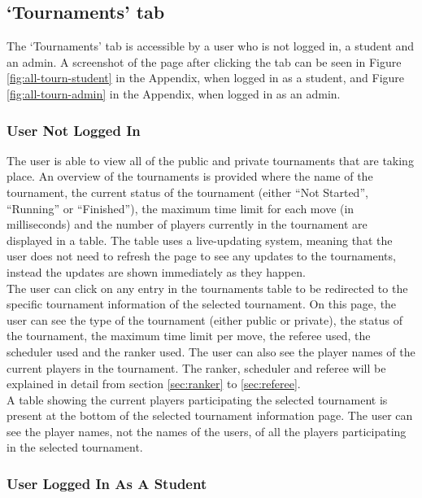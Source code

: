 \documentclass[a4paper, 12pt]{report}
\begin{document}
\subsection{`Tournaments' tab}
\label{sec:impl-tab-tournaments}

The `Tournaments' tab is accessible by a user who is not logged in, a student
and an admin. A screenshot of the page after clicking the tab can be seen in
Figure \ref{fig:all-tourn-student} in the Appendix, when logged in as a student,
and Figure \ref{fig:all-tourn-admin} in the Appendix, when logged in as an
admin.

\subsubsection*{User Not Logged In}

The user is able to view all of the public and private tournaments that are
taking place. An overview of the tournaments is provided where the name of the
tournament, the current status of the tournament (either ``Not Started'',
``Running'' or ``Finished''), the maximum time limit for each move (in milliseconds)
and the number of players currently in the tournament are displayed in a table.
The table uses a live-updating system, meaning that the user does not need to
refresh the page to see any updates to the tournaments, instead the updates are
shown immediately as they happen. \\

The user can click on any entry in the tournaments table to be redirected to
the specific tournament information of the selected tournament. On this page, the
user can see the type of the tournament (either public or private), the status
of the tournament, the maximum time limit per move, the referee used, the scheduler
used and the ranker used. The user can also see the player names of the current
players in the tournament. The ranker, scheduler and referee will be explained
in detail from section \ref{sec:ranker} to \ref{sec:referee}. \\

A table showing the current players participating the selected tournament is
present at the bottom of the selected tournament information page. The user can
see the player names, not the names of the users, of all the players participating
in the selected tournament.

\subsubsection*{User Logged In As A Student}
\end{document}

